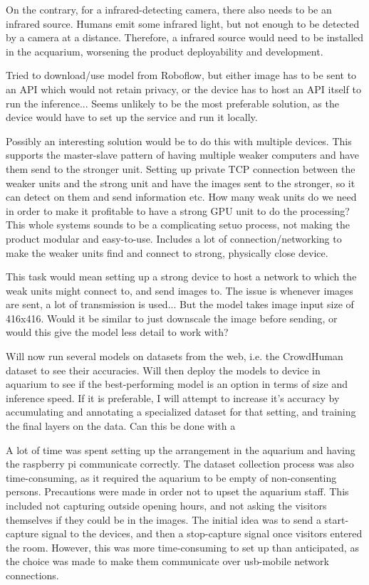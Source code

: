 On the contrary, for a infrared-detecting camera, there also needs to be an infrared source. Humans emit some infrared light, but not enough to be detected by a camera at a distance. Therefore, a infrared source would need to be installed in the acquarium, worsening the product deployability and development.


Tried to download/use model from Roboflow, but either image has to be sent to an API which would not retain privacy, or the device has to host an API itself to run the inference... Seems unlikely to be the most preferable solution, as the device would have to set up the service and run it locally.

Possibly an interesting solution would be to do this with multiple devices. This supports the master-slave pattern of having multiple weaker computers and have them send to the stronger unit.
Setting up private TCP connection between the weaker units and the strong unit and have the images sent to the stronger, so it can detect on them and send information etc. How many weak units do we need in order to make it profitable to have a strong GPU unit to do the processing? This whole systems sounds to be a complicating setuo process, not making the product modular and easy-to-use. Includes a lot of connection/networking to make the weaker units find and connect to strong, physically close device.

This task would mean setting up a strong device to host a network to which the weak units might connect to, and send images to. The issue is whenever images are sent, a lot of transmission is used... But the model takes image input size of 416x416. Would it be similar to just downscale the image before sending, or would this give the model less detail to work with?

Will now run several models on datasets from the web, i.e. the CrowdHuman dataset to see their accuracies. Will then deploy the models to device in aquarium to see if the best-performing model is an option in terms of size and inference speed. If it is preferable, I will attempt to increase it's accuracy by accumulating and annotating a specialized dataset for that setting, and training the final layers on the data. Can this be done with a



A lot of time was spent setting up the arrangement in the aquarium and having the raspberry pi communicate correctly. The dataset collection process was also time-consuming, as it required the aquarium to be empty of non-consenting persons. Precautions were made in order not to upset the aquarium staff. This included not capturing outside opening hours, and not asking the visitors themselves if they could be in the images. The initial idea was to send a start-capture signal to the devices, and then a stop-capture signal once visitors entered the room. However, this was more time-consuming to set up than anticipated, as the choice was made to make them communicate over usb-mobile network connections.